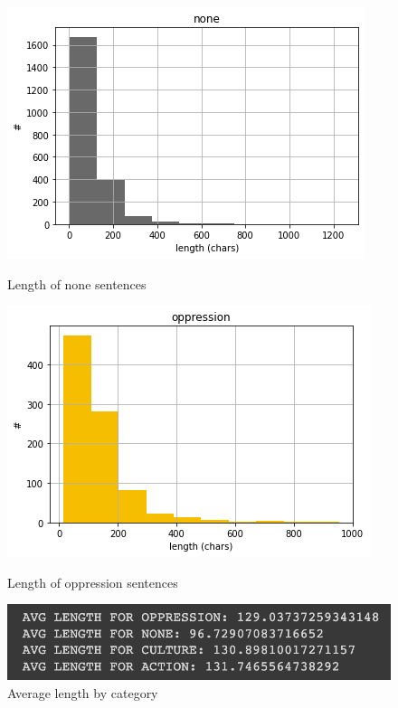 \documentclass[11pt,letterpaper]{article}
\begin{document}
\begin{figure}[hbt!]
  \centering
  \begin{minipage}[b]{0.45\textwidth}
    \includegraphics[width=\textwidth]{images/len_none.png}
    \label{fig:len_none}
    \caption{Length of none sentences}
  \end{minipage}
  \hfill
  \begin{minipage}[b]{0.45\textwidth}
    \includegraphics[width=\textwidth]{images/len_opp.png}
    \label{fig:len_opp}
    \caption{Length of oppression sentences}
  \end{minipage}
\end{figure}


\begin{figure}
    \centering
    \includegraphics[scale=0.8]{images/len_avg.png}
    \caption{Average length by category}
    \label{fig:len_avg}
\end{figure}
\end{document}
